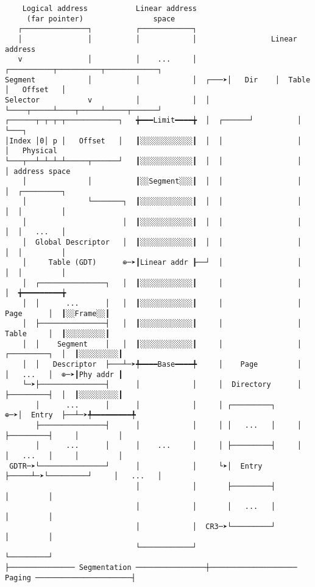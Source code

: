 \documentclass[varwidth=30cm]{standalone}
\begin{document}
\begin{verbatim}
    Logical address           Linear address
     (far pointer)                space
   ┌───────────────┐          ┌────────────┐
   │               │          │            │                 Linear address
   v               │          │    ...     │       ┌──────────┬──────────┬────────────┐
Segment            │          │            │  ┌───➤│   Dir    │  Table   │   Offset   │
Selector           v          │            │  │    └────┬─────┴────┬─────┴─────┬──────┘
┌──────┬─┬─┬─┬────────────┐   ╈━━━Limit━━━━╈  │  ┌──────┘          │           └───┐
│Index │0│ p │   Offset   │   ┃░░░░░░░░░░░░┃  │  │                 │               │   Physical
└───┬──┴─┴─┴─┴─────┬──────┘   ┃░░░░░░░░░░░░┃  │  │                 │               │ address space
    │              │          ┃░░Segment░░░┃  │  │                 │               │  ┌─────────┐
    │              └───────┐  ┃░░░░░░░░░░░░┃  │  │                 │               │  │         │
    │                      │  ┃░░░░░░░░░░░░┃  │  │                 │               │  │   ...   │
    │  Global Descriptor   │  ┃░░░░░░░░░░░░┃  │  │                 │               │  │         │
    │     Table (GDT)      ⊕─➤┃Linear addr ┠──┘  │                 │               │  │         │
    │  ┌───────────────┐   │  ┃░░░░░░░░░░░░┃     │                 │               │  ╈━━━━━━━━━╈
    │  │      ...      │   │  ┃░░░░░░░░░░░░┃     │                 │     Page      │  ┃░░Frame░░┃
    │  ├───────────────┤   │  ┃░░░░░░░░░░░░┃     │                 │     Table     │  ┃░░░░░░░░░┃
    │  │    Segment    │   │  ┃░░░░░░░░░░░░┃     │                 │  ┌─────────┐  │  ┃░░░░░░░░░┃
    │  │   Descriptor  ├───┴─➤╇━━━━Base━━━━╇     │    Page         │  │   ...   │  ⊕─➤┃Phy addr ┃
    └─➤├───────────────┤      │            │     │  Directory      │  ├─────────┤  │  ┃░░░░░░░░░┃
       │      ...      │      │            │     │ ┌─────────┐     ⊕─➤│  Entry  ├──┴─➤╇━━━━━━━━━╇
       ├───────────────┤      │            │     │ │   ...   │     │  ├─────────┤     │         │
       │      ...      │      │    ...     │     │ ├─────────┤     │  │   ...   │     │         │
 GDTR─➤└───────────────┘      │            │     └➤│  Entry  ├─────┴─➤└─────────┘     │   ...   │
                              │            │       ├─────────┤                        │         │
                              │            │       │   ...   │                        │         │
                              │            │  CR3─➤└─────────┘                        │         │
                              └────────────┘                                          └─────────┘
├─────────────── Segmentation ────────────────┼──────────────────── Paging ──────────────────────┤
\end{verbatim}
\end{document}
